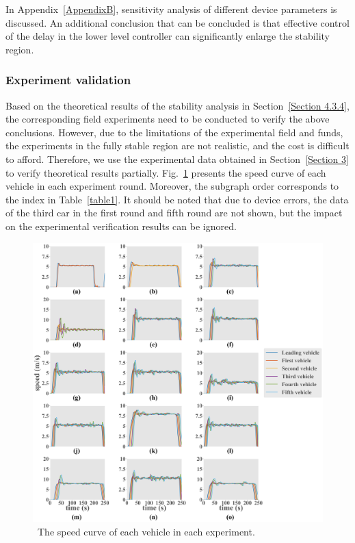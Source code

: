 \documentclass[journal]{IEEEtran}
\begin{document}
In Appendix~\ref{AppendixB}, sensitivity analysis of different device parameters is discussed. An additional conclusion that can be concluded is that effective control of the delay in the lower level controller can significantly enlarge the stability region.



\subsubsection{Experiment validation}
\label{Section 4.3.5}

Based on the theoretical results of the stability analysis in Section~\ref{Section 4.3.4}, the corresponding field experiments need to be conducted to verify the above conclusions. However, due to the limitations of the experimental field and funds, the experiments in the fully stable region are not realistic, and the cost is difficult to afford. Therefore, we use the experimental data obtained in Section~\ref{Section 3} to verify theoretical results partially. Fig.~\ref{fig7} presents the speed curve of each vehicle in each experiment round. Moreover, the subgraph order corresponds to the index in Table~\ref{table1}. It should be noted that due to device errors, the data of the third car in the first round and fifth round are not shown, but the impact on the experimental verification results can be ignored.


\begin{figure}
  \centering
  \includegraphics[width=16cm]{figs/fig7.png}
  \caption{~The speed curve of each vehicle in each experiment.}
  \label{fig7}
\end{figure}
\end{document}
